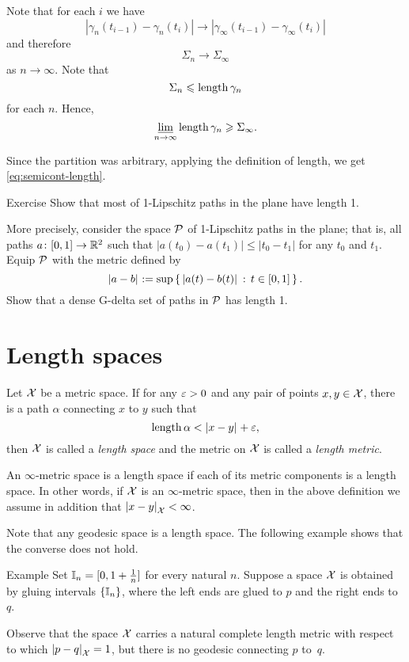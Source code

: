 Note that for each $i$ we have 
\[|\gamma_n(t_{i-1})-\gamma_n(t_i)|\to|\gamma_\infty(t_{i-1})-\gamma_\infty(t_i)|\]
and therefore
\[\Sigma_n\to \Sigma_\infty\] 
as $n\to\infty$.
Note that 
\[\Sigma_n\leqslant\mathop{\rm length}\nolimits\gamma_n\]
for each $n$.
Hence,
$$\varliminf_{n\to\infty} \mathop{\rm length}\nolimits\gamma_n \geqslant \Sigma_\infty.$$

Since the partition was arbitrary, applying the definition of length, we get \ref{eq:semicont-length}.
\qeds

\begin{thm}{Exercise}\label{ex:1-Lip-G-delta}
Show that most of 1-Lipschitz paths in the plane have length 1.

More precisely, consider the space $\mathcal{P}$ of 1-Lipschitz paths in the plane;
that is, all paths $a\colon[0,1]\to\mathbb{R}^2$ such that $|a(t_0)-a(t_1)|\le |t_0-t_1|$ for any $t_0$ and $t_1$.
Equip $\mathcal{P}$ with the metric defined by
\[\dist{a}{b}{}\df\sup\set{\dist{a(t)}{b(t)}{}}{t\in[0,1]}.\]
Show that a dense G-delta set of paths in $\mathcal{P}$ has length 1.

\end{thm}


\section{Length spaces}\label{sec:intrinsic}

Let $\mathcal{X}$ be a metric space.
If for any $\varepsilon>0$ and any pair of points $x,y\in\mathcal{X}$, there is a path $\alpha$ connecting $x$ to $y$ such that
\[\length\alpha< \dist{x}{y}{}+\eps,\]
then $\mathcal{X}$ is called a \emph{length space} and the metric on $\mathcal{X}$ is called a \emph{length metric}.\label{page:length metric}

An $\infty$-metric space is a length space if each of its metric components is a length space.
In other words, if $\mathcal{X}$ is an $\infty$-metric space, then in the above definition we assume in addition that $\dist{x}{y}{\spc{X}}<\infty$.

Note that any geodesic space is a length space.
The following example shows that the converse does not hold.


\begin{thm}{Example}
Set $\mathbb{I}_n=[0,1+\tfrac1n]$ for every natural $n$.
Suppose a space $\mathcal{X}$ is obtained by gluing intervals $\{\mathbb{I}_n\}$, where the left ends are glued to $p$ and the right ends to~$q$.

Observe that the space $\mathcal{X}$ carries a natural complete length metric with respect to which $\dist{p}{q}{\spc{X}}=1$, but there is no geodesic connecting $p$ to~$q$.
\end{thm}


